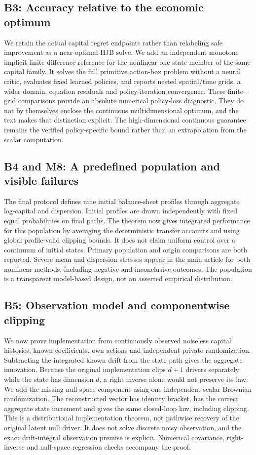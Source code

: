 \subsection*{B3: Accuracy relative to the economic optimum}
We retain the actual capital regret endpoints rather than relabeling safe improvement as a near-optimal HJB solve. We add an independent monotone implicit finite-difference reference for the nonlinear one-state member of the same capital family. It solves the full primitive action-box problem without a neural critic, evaluates fixed learned policies, and reports nested spatial/time grids, a wider domain, equation residuals and policy-iteration convergence. These finite-grid comparisons provide an absolute numerical policy-loss diagnostic. They do not by themselves enclose the continuous multidimensional optimum, and the text makes that distinction explicit. The high-dimensional continuous guarantee remains the verified policy-specific bound rather than an extrapolation from the scalar computation.

\subsection*{B4 and M8: A predefined population and visible failures}
The final protocol defines nine initial balance-sheet profiles through aggregate log-capital and dispersion. Initial profiles are drawn independently with fixed equal probabilities on final paths. The theorem now gives integrated performance for this population by averaging the deterministic transfer accounts and using global profile-valid clipping bounds. It does not claim uniform control over a continuum of initial states. Primary population and origin comparisons are both reported. Severe mean and dispersion stresses appear in the main article for both nonlinear methods, including negative and inconclusive outcomes. The population is a transparent model-based design, not an asserted empirical distribution.

\subsection*{B5: Observation model and componentwise clipping}
We now prove implementation from continuously observed noiseless capital histories, known coefficients, own actions and independent private randomization. Subtracting the integrated known drift from the state path gives the aggregate innovation. Because the original implementation clips $d+1$ drivers separately while the state has dimension $d$, a right inverse alone would not preserve its law. We add the missing null-space component using one independent scalar Brownian randomization. The reconstructed vector has identity bracket, has the correct aggregate state increment and gives the same closed-loop law, including clipping. This is a distributional implementation theorem, not pathwise recovery of the original latent null driver. It does not solve discrete noisy observation, and the exact drift-integral observation premise is explicit. Numerical covariance, right-inverse and null-space regression checks accompany the proof.

